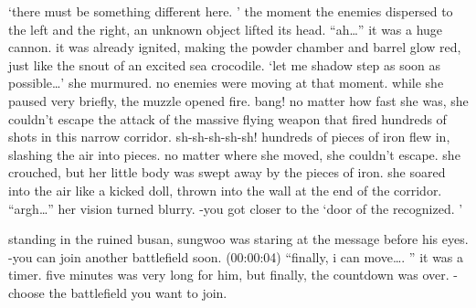  ‘there must be something different here.
’ the moment the enemies dispersed to the left and the right, an unknown object lifted its head.
 “ah…” it was a huge cannon.
 it was already ignited, making the powder chamber and barrel glow red, just like the snout of an excited sea crocodile.
 ‘let me shadow step as soon as possible…’ she murmured.
 no enemies were moving at that moment.
 while she paused very briefly, the muzzle opened fire.
 bang! no matter how fast she was, she couldn’t escape the attack of the massive flying weapon that fired hundreds of shots in this narrow corridor.
 sh-sh-sh-sh-sh! hundreds of pieces of iron flew in, slashing the air into pieces.
 no matter where she moved, she couldn’t escape.
 she crouched, but her little body was swept away by the pieces of iron.
 she soared into the air like a kicked doll, thrown into the wall at the end of the corridor.
 “argh…” her vision turned blurry.
 -you got closer to the ‘door of the recognized.
’ 

standing in the ruined busan, sungwoo was staring at the message before his eyes.
 -you can join another battlefield soon.
 (00:00:04) “finally, i can move….
” it was a timer.
 five minutes was very long for him, but finally, the countdown was over.
 -choose the battlefield you want to join.


 